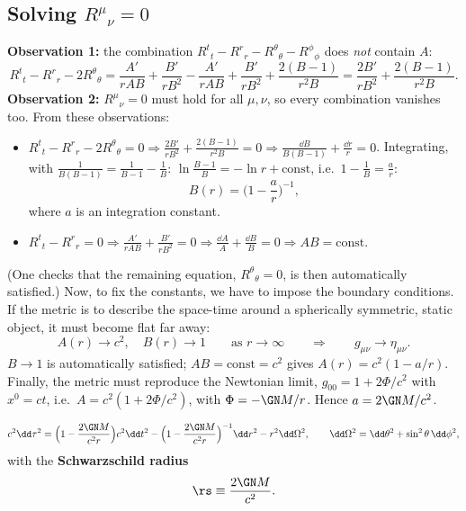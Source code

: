 \subsection{Solving $R^\mu{}_\nu=0$}
\textbf{Observation 1:} the combination $R^t{}_t-R^r{}_r-R^\theta{}_\theta-R^\phi{}_\phi$ does \emph{not} contain $A$:
\[
  R^t{}_t-R^r{}_r-2R^\theta{}_\theta=\frac{A'}{rAB}+\frac{B'}{rB^2}-\frac{A'}{rAB}+\frac{B'}{rB^2}+\frac{2(B-1)}{r^2B}=\frac{2B'}{rB^2}+\frac{2(B-1)}{r^2B}.
\]
\textbf{Observation 2:} $R^\mu{}_\nu=0$ must hold for all $\mu,\nu$, so every combination vanishes too. From these observations:
\begin{itemize}
\item $R^t{}_t-R^r{}_r-2R^\theta{}_\theta=0\Rightarrow\frac{2B'}{rB^2}+\frac{2(B-1)}{r^2B}=0\Rightarrow\frac{\dd B}{B(B-1)}+\frac{\dd r}{r}=0$. Integrating, with $\frac{1}{B(B-1)}=\frac1{B-1}-\frac1B$: $\ln\frac{B-1}{B}=-\ln r+\text{const}$, i.e.\ $1-\frac1B=\frac ar$:
\begin{equation}
  B(r)=\Big(1-\frac ar\Big)^{-1},
\end{equation}
where $a$ is an integration constant.
\item $R^t{}_t-R^r{}_r=0\Rightarrow\frac{A'}{rAB}+\frac{B'}{rB^2}=0\Rightarrow\frac{\dd A}{A}+\frac{\dd B}{B}=0\Rightarrow AB=\text{const}$.
\end{itemize}
(One checks that the remaining equation, $R^\theta{}_\theta=0$, is then automatically satisfied.) Now, to fix the constants, we have to impose the boundary conditions. If the metric is to describe the space-time around a spherically symmetric, static object, it must become flat far away:
\[
  A(r)\to c^2,\quad B(r)\to1\qquad\text{as }r\to\infty\qquad\Longrightarrow\qquad g_{\mu\nu}\to\eta_{\mu\nu}.
\]
$B\to1$ is automatically satisfied; $AB=\text{const}=c^2$ gives $A(r)=c^2(1-a/r)$. Finally, the metric must reproduce the Newtonian limit, $g_{00}=1+2\Phi/c^2$ with $x^0=ct$, i.e.\ $A=c^2(1+2\Phi/c^2)$, with $\Phi=-\GN M/r$. Hence $a=2\GN M/c^2$.

\begin{keyresult}
\begin{equation}
  c^2\dd\tau^2=\Big(1-\frac{2\GN M}{c^2r}\Big)c^2\dd t^2-\Big(1-\frac{2\GN M}{c^2r}\Big)^{-1}\dd r^2-r^2\dd\Omega^2 ,\qquad \dd\Omega^2=\dd\theta^2+\sin^2\theta\,\dd\phi^2,
  \label{eq:schwarzschild}
\end{equation}
with the \textbf{Schwarzschild radius}
\begin{equation}
  \rs\equiv\frac{2\GN M}{c^2}.
\end{equation}
\end{keyresult}

